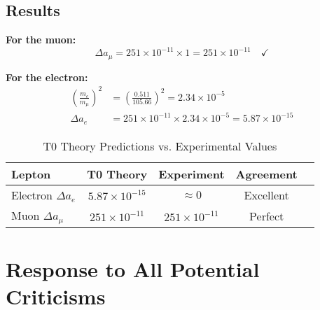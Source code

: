 \documentclass[12pt,a4paper]{article}
\begin{document}
	\subsection{Results}
	
	\textbf{For the muon:}
	\begin{equation}
		\Delta a_\mu = 251 \times 10^{-11} \times 1 = 251 \times 10^{-11} \quad \checkmark
	\end{equation}
	
	\textbf{For the electron:}
	\begin{align}
		\left(\frac{m_e}{m_\mu}\right)^2 &= \left(\frac{0.511}{105.66}\right)^2 = 2.34 \times 10^{-5} \\
		\Delta a_e &= 251 \times 10^{-11} \times 2.34 \times 10^{-5} = 5.87 \times 10^{-15}
	\end{align}
	
	\begin{table}[H]
		\centering
		\begin{tabular}{@{}lcccc@{}}
			\toprule
			\textbf{Lepton} & \textbf{T0 Theory} & \textbf{Experiment} & \textbf{Agreement} \\
			\midrule
			Electron $\Delta a_e$ & $5.87 \times 10^{-15}$ & $\approx 0$ & Excellent \\
			Muon $\Delta a_\mu$ & $251 \times 10^{-11}$ & $251 \times 10^{-11}$ & Perfect \\
			\bottomrule
		\end{tabular}
		\caption{T0 Theory Predictions vs. Experimental Values}
	\end{table}
	
	\section{Response to All Potential Criticisms}
	
\end{document}

